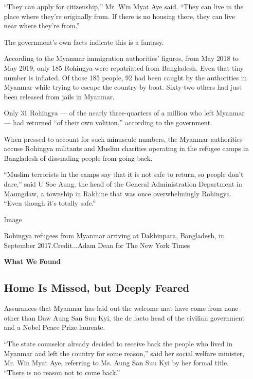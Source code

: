 ``They can apply for citizenship,'' Mr. Win Myat Aye said. ``They can
live in the place where they're originally from. If there is no housing
there, they can live near where they're from.''

The government's own facts indicate this is a fantasy.

According to the Myanmar immigration authorities' figures, from May 2018
to May 2019, only 185 Rohingya were repatriated from Bangladesh. Even
that tiny number is inflated. Of those 185 people, 92 had been caught by
the authorities in Myanmar while trying to escape the country by boat.
Sixty-two others had just been released from jails in Myanmar.

Only 31 Rohingya --- of the nearly three-quarters of a million who left
Myanmar --- had returned ``of their own volition,'' according to the
government.

When pressed to account for such minuscule numbers, the Myanmar
authorities accuse Rohingya militants and Muslim charities operating in
the refugee camps in Bangladesh of dissuading people from going back.

``Muslim terrorists in the camps say that it is not safe to return, so
people don't dare,'' said U Soe Aung, the head of the General
Administration Department in Maungdaw, a township in Rakhine that was
once overwhelmingly Rohingya. ``Even though it's totally safe.''

Image

Rohingya refugees from Myanmar arriving at Dakhinpara, Bangladesh, in
September 2017.Credit...Adam Dean for The New York Times

\textbf{What We Found}

\hypertarget{home-is-missed-but-deeply-feared}{%
\subsection{Home Is Missed, but Deeply
Feared}\label{home-is-missed-but-deeply-feared}}

Assurances that Myanmar has laid out the welcome mat have come from none
other than Daw Aung San Suu Kyi, the de facto head of the civilian
government and a Nobel Peace Prize laureate.

``The state counselor already decided to receive back the people who
lived in Myanmar and left the country for some reason,'' said her social
welfare minister, Mr. Win Myat Aye, referring to Ms. Aung San Suu Kyi by
her formal title. ``There is no reason not to come back.''

